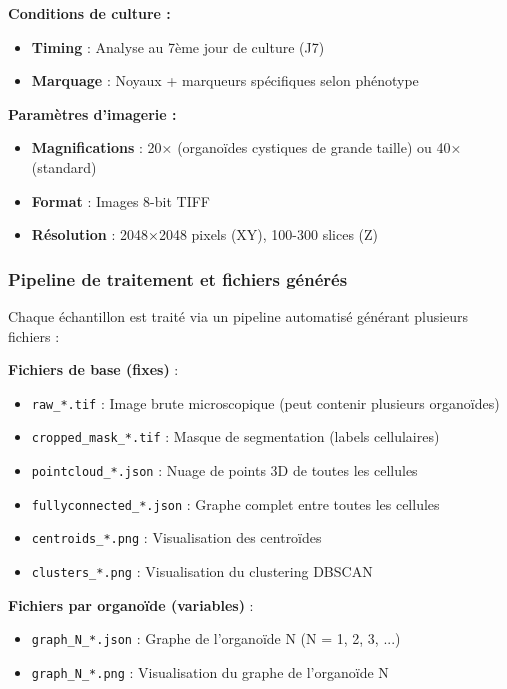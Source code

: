 \textbf{Conditions de culture :}
\begin{itemize}
    \item \textbf{Timing} : Analyse au 7ème jour de culture (J7)
    \item \textbf{Marquage} : Noyaux + marqueurs spécifiques selon phénotype
\end{itemize}

\textbf{Paramètres d'imagerie :}
\begin{itemize}
    \item \textbf{Magnifications} : 20× (organoïdes cystiques de grande taille) ou 40× (standard)
    \item \textbf{Format} : Images 8-bit TIFF
    \item \textbf{Résolution} : 2048×2048 pixels (XY), 100-300 slices (Z)
\end{itemize}

\subsubsection{Pipeline de traitement et fichiers générés}

Chaque échantillon est traité via un pipeline automatisé générant plusieurs fichiers :

\textbf{Fichiers de base (fixes)} :
\begin{itemize}
    \item \texttt{raw\_*.tif} : Image brute microscopique (peut contenir plusieurs organoïdes)
    \item \texttt{cropped\_mask\_*.tif} : Masque de segmentation (labels cellulaires)
    \item \texttt{pointcloud\_*.json} : Nuage de points 3D de toutes les cellules
    \item \texttt{fullyconnected\_*.json} : Graphe complet entre toutes les cellules
    \item \texttt{centroids\_*.png} : Visualisation des centroïdes
    \item \texttt{clusters\_*.png} : Visualisation du clustering DBSCAN
\end{itemize}

\textbf{Fichiers par organoïde (variables)} :
\begin{itemize}
    \item \texttt{graph\_N\_*.json} : Graphe de l'organoïde N (N = 1, 2, 3, ...)
    \item \texttt{graph\_N\_*.png} : Visualisation du graphe de l'organoïde N
\end{itemize}

